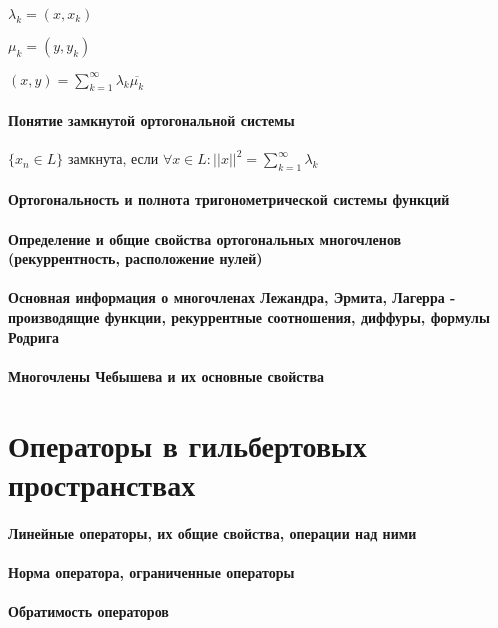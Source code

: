 \documentclass[russian,twocolumn]{article}
\begin{document}
$\lambda _k = (x,x_k)$

$\mu _k = (y,y_k)$

$(x,y) = \sum_{k=1}^\infty \lambda_k \overline{\mu_k}$

\paragraph{Понятие замкнутой ортогональной системы}

$\{x_n \in L\}$ замкнута, если $\forall x \in L : ||x||^2=\sum _{k=1}^\infty \lambda _k$

\paragraph{Ортогональность и полнота тригонометрической системы функций}

\paragraph{Определение и общие свойства ортогональных многочленов (рекуррентность, расположение нулей)}

\paragraph{Основная информация о многочленах Лежандра, Эрмита, Лагерра - производящие функции, рекуррентные соотношения, диффуры, формулы Родрига}

\paragraph{Многочлены Чебышева и их основные свойства}

\section{Операторы в гильбертовых пространствах}

\paragraph{Линейные операторы, их общие свойства, операции над ними}

\paragraph{Норма оператора, ограниченные операторы}

\paragraph{Обратимость операторов}
\end{document}
